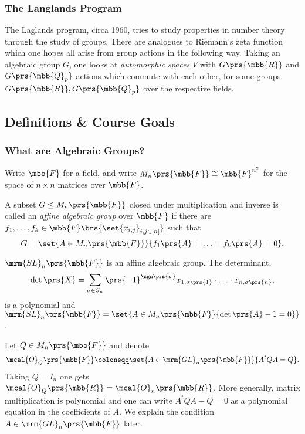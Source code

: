 \documentclass[10pt,a4paper,twoside,openany,hidelinks]{book}
\begin{document}
\subsubsection{The Langlands Program}

The Laglands program, circa 1960, tries to study properties in number theory through the study of groups. There are analogues to Riemann's zeta function which one hopes all arise from group actions in the following way.
Taking an algebraic group $G$, one looks at \emph{automorphic spaces} $V$ with $G\prs{\mbb{R}}$ and $G\prs{\mbb{Q}_p}$ actions which commute with each other, for some groups $G\prs{\mbb{R}}, G\prs{\mbb{Q}_p}$ over the respective fields.

\subsection{Definitions \& Course Goals}

\subsubsection{What are Algebraic Groups?}

Write $\mbb{F}$ for a field, and write $M_n\prs{\mbb{F}} \cong \mbb{F}^{n^2}$ for the space of $n \times n$ matrices over $\mbb{F}$.

\begin{definition}
A subset $G \leq M_n\prs{\mbb{F}}$ closed under multiplication and inverse is called an \emph{affine algebraic group} over $\mbb{F}$ if there are $f_1, \ldots, f_k \in \mbb{F}\brs{\set{x_{i,j}}_{i,j \in [n]}}$ such that
\[G = \set{A \in M_n\prs{\mbb{F}}}{f_1\prs{A} = \ldots = f_k\prs{A} = 0} \text{.}\]
\end{definition}

\begin{example}
$\mrm{SL}_n\prs{\mbb{F}}$ is an affine algebraic group. The determinant,
\[\det\prs{X} = \sum_{\sigma \in S_n} \prs{-1}^{\sgn\prs{\sigma}} x_{1,\sigma\prs{1}} \cdot \ldots \cdot x_{n,\sigma\prs{n}} \text{,}\]
is a polynomial and $\mrm{SL}_n\prs{\mbb{F}} = \set{A \in M_n\prs{\mbb{F}}{\det\prs{A} - 1 = 0}}$.
\end{example}

\begin{example}
Let $Q \in M_n\prs{\mbb{F}}$ and denote
\[\mcal{O}_{Q}\prs{\mbb{F}} \coloneqq \set{A \in \mrm{GL}_n\prs{\mbb{F}}}{A^t Q A = Q} \text{.}\]
Taking $Q = I_n$ one gets $\mcal{O}_Q\prs{\mbb{R}} = \mcal{O}_n\prs{\mbb{R}}$. More generally, matrix multiplication is polynomial and one can write $A^t Q A - Q = 0$ as a polynomial equation in the coefficients of $A$. We explain the condition $A \in \mrm{GL}_n\prs{\mbb{F}}$ later.
\end{example}
\end{document}
